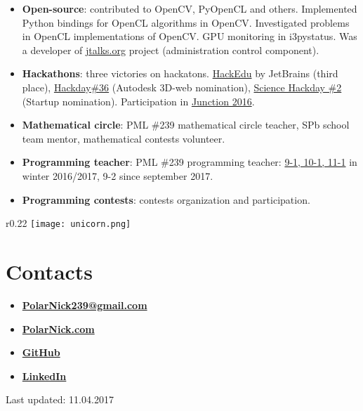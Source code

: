 \documentclass[11pt,oneside]{article}
\newcommand{\hhref}[2]{\href{#1}{\color{blue}#2}}
\begin{document}
\begin{itemize}
    \item{\textbf{Open-source}: contributed to OpenCV, PyOpenCL and others. Implemented Python bindings for OpenCL algorithms in OpenCV. Investigated problems in OpenCL implementations of OpenCV. GPU monitoring in i3pystatus. Was a developer of \hhref{http://jtalks.org/}{jtalks.org} project (administration control component)}.
    
    \item{\textbf{Hackathons}}: three victories on hackatons. \hhref{https://www.hackerleague.org/hackathons/jetbrains-edtech-hackathon/blogposts/53655896e24d32cfbd000006}{HackEdu} by JetBrains (third place), \hhref{http://hackday.ru/hackday-36/projects\#project-1121}{Hackday\#36} (Autodesk 3D-web nomination), \hhref{http://hackday.ru/sciencehackday-2/projects\#project-1400}{Science Hackday \#2} (Startup nomination). Participation in \hhref{http://www.hackjunction.com/}{Junction 2016}.
    
    \item{\textbf{Mathematical circle}}: PML \#239 mathematical circle teacher, SPb school team mentor, mathematical contests volunteer.
    
    \item{\textbf{Programming teacher}}: PML \#239 programming teacher: \hhref{http://polarnick239.github.io/239/201612}{9-1, 10-1, 11-1} in winter 2016/2017, 9-2 since september 2017.
    
    \item{\textbf{Programming contests}}: contests organization and participation.
\end{itemize}

\begin{wrapfigure}{r}{0.22\textwidth}
    \centering
    \texttt{[image: unicorn.png]}
\end{wrapfigure}

\vspace{-9pt}
\section*{\textbf{Contacts}}
\vspace{-9pt}

\begin{itemize}
    
    \item{\textbf{\hhref{mailto:PolarNick239@gmail.com}{PolarNick239@gmail.com}}}
    
    \item{\textbf{\hhref{http://polarnick239.github.io}{PolarNick.com}}}
    
    \item{\textbf{\hhref{https://github.com/PolarNick239}{GitHub}}}
    
    \item{\textbf{\hhref{https://www.linkedin.com/in/nickolay-polyarniy-61393b7b}{LinkedIn}}}
    
    
    
\end{itemize}


Last updated: 11.04.2017
\end{document}
